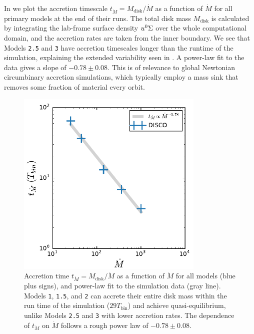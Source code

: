 In  we plot the accretion timescale $t_{\dot{M}} = M_\text{disk} / \dot{M}$ as a function of $\dot{M}$ for all primary models at the end of their runs.  The total disk mass $M_\text{disk}$ is calculated by integrating the lab-frame surface density $u^0 \Sigma$ over the whole computational domain, and the accretion rates are taken from the inner boundary.  We see that Models \texttt{2.5} and \texttt{3} have accretion timescales longer than the runtime of the simulation, explaining the extended variability seen in .  A power-law fit to the data gives a slope of $-0.78 \pm 0.08$. This is of relevance to global Newtonian circumbinary accretion simulations, which typically employ a mass sink that removes some fraction of material every orbit.

\begin{figure}
\begin{center}
\includegraphics[width=0.8\textwidth]{figures/minidisk/tacc.pdf}
\end{center}
\caption{ Accretion time $t_{\dot{M}}=M_\text{disk}/\dot{M}$ as a function of $\dot{M}$ for all models (blue plus signs), and power-law fit to the simulation data (gray line).  Models \texttt{1}, \texttt{1.5}, and \texttt{2} can accrete their entire disk mass within the run time of the simulation ($29 T_\text{bin}$) and achieve quasi-equilibrium, unlike Models \texttt{2.5} and \texttt{3} with lower accretion rates. The dependence of $t_{\dot{M}}$ on $\dot{M}$ follows a rough power law of $-0.78 \pm 0.08$.}
\end{figure}

